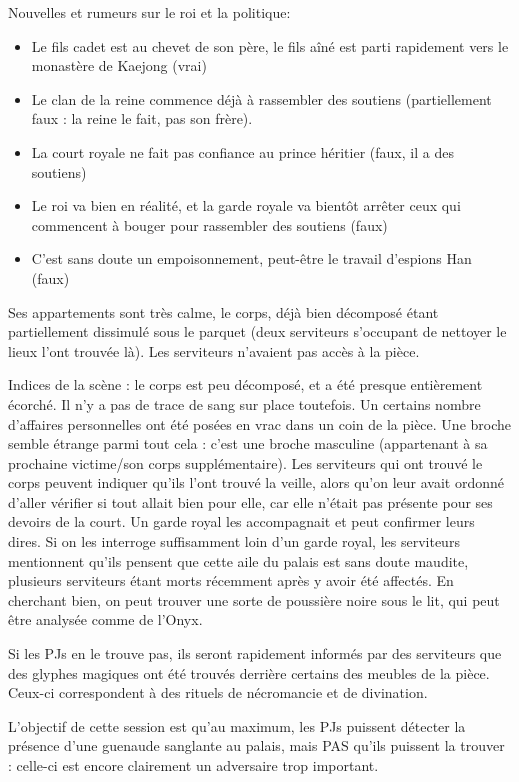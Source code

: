 \documentclass[10pt,a4paper]{book}
\begin{document}
Nouvelles et rumeurs sur le roi et la politique:
\begin{itemize}
\item Le fils cadet est au chevet de son père, le fils aîné est parti rapidement vers le monastère de Kaejong (vrai) 
\item Le clan de la reine commence déjà à rassembler des soutiens (partiellement faux : la reine le fait, pas son frère).
\item La court royale ne fait pas confiance au prince héritier (faux, il a des soutiens)
\item Le roi va bien en réalité, et la garde royale va bientôt arrêter ceux qui commencent à bouger pour rassembler des soutiens (faux)
\item C'est sans doute un empoisonnement, peut-être le travail d'espions Han (faux)
\end{itemize}

Ses appartements sont très calme, le corps, déjà bien décomposé étant partiellement dissimulé sous le parquet (deux serviteurs s'occupant de nettoyer le lieux l'ont trouvée là). Les serviteurs n'avaient pas accès à la pièce.

Indices de la scène : le corps est peu décomposé, et a été presque entièrement écorché. Il n'y a pas de trace de sang sur place toutefois. Un certains nombre d'affaires personnelles ont été posées en vrac dans un coin de la pièce. Une broche semble étrange parmi tout cela : c'est une broche masculine (appartenant à sa prochaine victime/son corps supplémentaire). Les serviteurs qui ont trouvé le corps peuvent indiquer qu'ils l'ont trouvé la veille, alors qu'on leur avait ordonné d'aller vérifier si tout allait bien pour elle, car elle n'était pas présente pour ses devoirs de la court. Un garde royal les accompagnait et peut confirmer leurs dires. Si on les interroge suffisamment loin d'un garde royal, les serviteurs mentionnent qu'ils pensent que cette aile du palais est sans doute maudite, plusieurs serviteurs étant morts récemment après y avoir été affectés. En cherchant bien, on peut trouver une sorte de poussière noire sous le lit, qui peut être analysée comme de l'Onyx.

Si les PJs en le trouve pas, ils seront rapidement informés par des serviteurs que des glyphes magiques ont été trouvés derrière certains des meubles de la pièce. Ceux-ci correspondent à des rituels de nécromancie et de divination. 

L'objectif de cette session est qu'au maximum, les PJs puissent détecter la présence d'une guenaude sanglante au palais, mais PAS qu'ils puissent la trouver : celle-ci est encore clairement un adversaire trop important.
\end{document}
